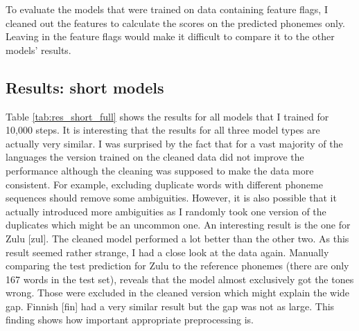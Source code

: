 To evaluate the models that were trained on data containing feature flags, I cleaned out the features to calculate the scores on the predicted phonemes only. Leaving in the feature flags would make it difficult to compare it to the other models' results.

\subsection{Results: short models}
Table \ref{tab:res_short_full} shows the results for all models that I trained for 10,000 steps. It is interesting that the results for all three model types are actually very similar. I was surprised by the fact that for a vast majority of the languages the version trained on the cleaned data did not improve the performance although the cleaning was supposed to make the data more consistent. For example, excluding duplicate words with different phoneme sequences should remove some ambiguities. However, it is also possible that it actually introduced more ambiguities as I randomly took one version of the duplicates which might be an uncommon one. An interesting result is the one for Zulu [zul]. The cleaned model performed a lot better than the other two. As this result seemed rather strange, I had a close look at the data again. Manually comparing the test prediction for Zulu to the reference phonemes (there are only 167 words in the test set), reveals that the model almost exclusively got the tones wrong. Those were excluded in the cleaned version which might explain the wide gap. Finnish [fin] had a very similar result but the gap was not as large. This finding shows how important appropriate preprocessing is.

